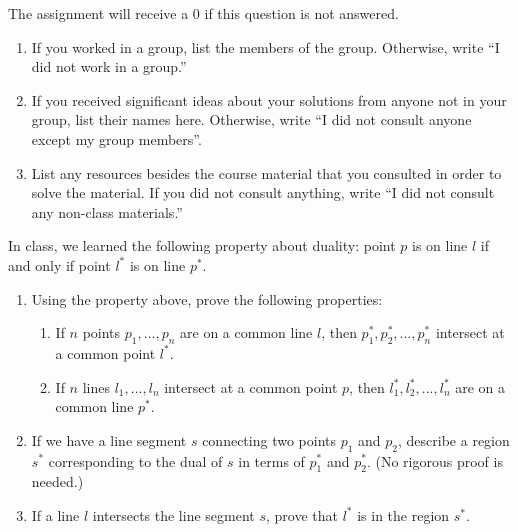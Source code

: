 \documentclass[11pt]{article}
\begin{document}
\maketitle


\begin{qunlist}
\setcounter{sparectr}{-1}
	The assignment will receive a 0 if this question is not answered.
\begin{enumerate}
	\item If you worked in a group, list the members of the group. Otherwise, write ``I did not work in a group.''
	\item If you received significant ideas about your solutions from anyone not in your group, list their names here. Otherwise, write ``I did not consult  anyone except my group members''.
	\item List any resources besides the course material that you consulted in order to solve the material. If you did not consult anything, write ``I did not consult any non-class materials.''
\end{enumerate}

% 
In class, we learned the following property about duality: point $p$ is on line $l$ if and only if point $l^*$ is on line $p^*$.
\begin{enumerate}
    \item Using the property above, prove the following properties:
    \begin{enumerate}
        \item If $n$ points $p_1, ..., p_n$ are on a common line $l$, then $p_1^*, p_2^*, ..., p_n^*$ intersect at a common point $l^*$.
        \item If $n$ lines $l_1, ..., l_n$ intersect at a common point $p$, then $l_1^*, l_2^*, ..., l_n^*$ are on a common line $p^*$.
    \end{enumerate}
    \item If we have a line segment $s$ connecting two points $p_1$ and $p_2$, describe a region $s^*$ corresponding to the dual of $s$ in terms of $p_1^*$ and $p_2^*$. (No rigorous proof is needed.)
    \item If a line $l$ intersects the line segment $s$, prove that $l^*$ is in the region $s^*$.
\end{enumerate}


\end{qunlist}
\end{document}
